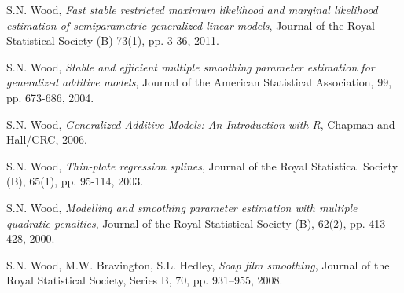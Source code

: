 \documentclass[a4paper,11pt,twoside,openright]{book}							%
\begin{document}
\begin{thebibliography}{99}
S.N. Wood, \emph{Fast stable restricted maximum likelihood and marginal likelihood estimation of semiparametric generalized linear models}, Journal of the Royal Statistical Society (B) 73(1), pp. 3-36, 2011.

S.N. Wood, \emph{Stable and efficient multiple smoothing parameter estimation for generalized additive models}, Journal of the American Statistical Association, 99, pp. 673-686, 2004.

S.N. Wood, \emph{Generalized Additive Models: An Introduction with R}, Chapman and Hall/CRC, 2006.

S.N. Wood, \emph{Thin-plate regression splines}, Journal of the Royal Statistical Society (B), 65(1), pp. 95-114, 2003.
  
S.N. Wood, \emph{Modelling and smoothing parameter estimation with multiple quadratic penalties}, Journal of the Royal Statistical Society (B), 62(2), pp. 413-428, 2000.

S.N. Wood, M.W. Bravington, S.L. Hedley, \emph{Soap film smoothing}, Journal of the Royal Statistical Society, Series B, 70, pp. 931–955, 2008.


\end{thebibliography}
\end{document}
